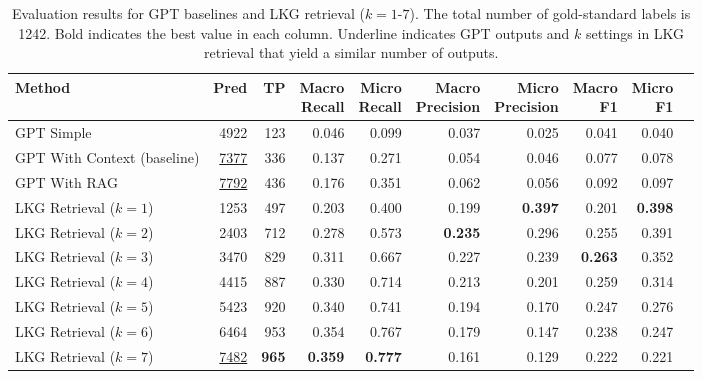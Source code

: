 \documentclass[11pt]{article}
\begin{document}
\begin{table}[t]
  \centering
  \caption{Evaluation results for GPT baselines and LKG retrieval ($k=1$-$7$). 
  The total number of gold-standard labels is 1242.
Bold indicates the best value in each column. Underline indicates GPT outputs and $k$ settings in LKG retrieval that yield a similar number of outputs.}
    \label{tab:legal-search}
  \begin{tabular}{p{4cm}rrrrrrrrr}
    \toprule
    Method & Pred & TP & \shortstack{Macro\\Recall} & \shortstack{Micro\\Recall} & \shortstack{Macro\\Precision} & \shortstack{Micro\\Precision} & \shortstack{Macro\\F1} & \shortstack{Micro\\F1} \\
    \midrule
    GPT Simple & 4922 & 123 & 0.046 & 0.099 & 0.037 & 0.025 & 0.041 & 0.040 \\
    GPT With Context (baseline) & \underline{7377} & 336 & 0.137 & 0.271 & 0.054 & 0.046 & 0.077 & 0.078 \\
    
    GPT With RAG & \underline{7792} & 436 & 0.176 & 0.351 & 0.062 & 0.056 & 0.092 & 0.097 \\
    \hdashline
    LKG Retrieval ($k=1$) & 1253 & 497 & 0.203 & 0.400 & 0.199 & \textbf{0.397} & 0.201 & \textbf{0.398} \\
    LKG Retrieval ($k=2$) & 2403 & 712 & 0.278 & 0.573 & \textbf{0.235} & 0.296 & 0.255 & 0.391 \\
    LKG Retrieval ($k=3$) & 3470 & 829 & 0.311 & 0.667 & 0.227 & 0.239 & \textbf{0.263} & 0.352 \\
    LKG Retrieval ($k=4$) & 4415 & 887 & 0.330 & 0.714 & 0.213 & 0.201 & 0.259 & 0.314 \\
    LKG Retrieval ($k=5$) & 5423 & 920 & 0.340 & 0.741 & 0.194 & 0.170 & 0.247 & 0.276 \\
    LKG Retrieval ($k=6$) & 6464 & 953 & 0.354 & 0.767 & 0.179 & 0.147 & 0.238 & 0.247 \\
    LKG Retrieval ($k=7$) & \underline{7482} & \textbf{965 }& \textbf{0.359 }& \textbf{0.777} & 0.161 & 0.129 & 0.222 & 0.221 \\
    \bottomrule
  \end{tabular}
\end{table}
\end{document}
